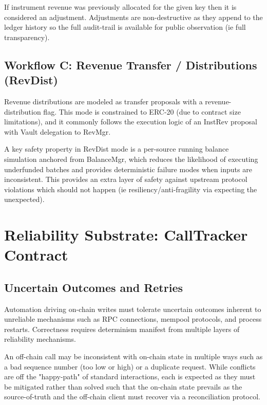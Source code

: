 \documentclass[10pt]{article}
\begin{document}
\begin{GsNoteLow}
    If instrument revenue was previously allocated for the given key then it is considered an adjustment. Adjustments are non-destructive as they append to the ledger history so the full audit-trail is available for public observation (ie full transparency).
\end{GsNoteLow}

\subsection{Workflow C: Revenue Transfer / Distributions (RevDist)}
Revenue distributions are modeled as transfer proposals with a revenue-distribution flag. This mode
is constrained to ERC-20 (due to contract size limitations), and it commonly follows
the execution logic of an InstRev proposal with Vault delegation to RevMgr.

A key safety property in RevDist mode is a per-source running balance simulation anchored from
BalanceMgr, which reduces the likelihood of executing underfunded batches and provides deterministic
failure modes when inputs are inconsistent. This provides an extra layer of safety against upstream
protocol violations which should not happen (ie resiliency/anti-fragility via expecting the unexpected).

\clearpage
\section{Reliability Substrate: CallTracker Contract}

\subsection{Uncertain Outcomes and Retries}
Automation driving on-chain writes must tolerate uncertain outcomes inherent to unreliable mechanisms such as
RPC connections, mempool protocols, and process restarts. Correctness requires determinism manifest from
multiple layers of reliability mechanisms.

An off-chain call may be inconsistent with on-chain state in multiple ways such as a bad sequence number (too low or high) or a duplicate request. While conflicts are off the "happy-path" of standard interactions, each is expected
as they must be mitigated rather than solved such that the on-chain state prevails as the source-of-truth and the off-chain client must recover via a reconciliation protocol.
\end{document}

